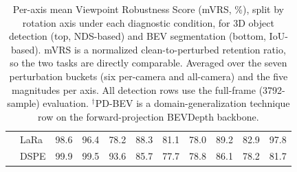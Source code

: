 \begin{table}[t]
\begin{tabular}{ll ccc ccc ccc}
 & LaRa & 98.6 & 96.4 & 78.2 & 88.3 & 81.1 & 78.0 & 89.2 & 82.9 & 97.8\\
 & DSPE & 99.9 & 99.5 & 93.6 & 85.7 & 77.7 & 78.8 & 86.1 & 78.2 & 81.7\\
\bottomrule
\end{tabular}
\caption{Per-axis mean Viewpoint Robustness Score (mVRS, \%), split by rotation axis under each diagnostic condition, for 3D object detection (top, NDS-based) and BEV segmentation (bottom, IoU-based). mVRS is a normalized clean-to-perturbed retention ratio, so the two tasks are directly comparable. Averaged over the seven perturbation buckets (six per-camera and all-camera) and the five magnitudes per axis. All detection rows use the full-frame (3792-sample) evaluation. $^\dagger$PD-BEV is a domain-generalization technique row on the forward-projection BEVDepth backbone.}
\label{tab:supp_peraxis}
\end{table}
